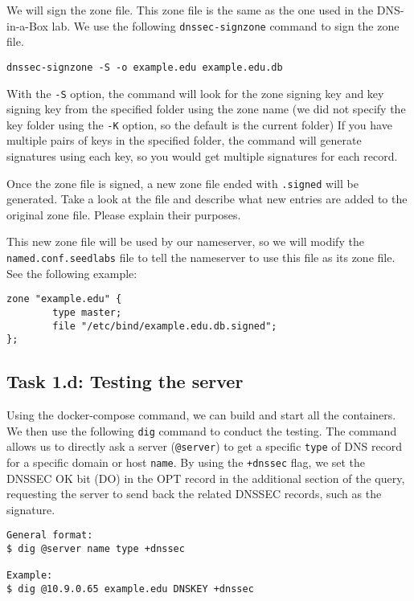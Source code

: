 We will sign the zone file. This zone file 
is the same as the one used in the DNS-in-a-Box lab. We use the 
following \texttt{dnssec-signzone} command to sign the zone file.  


\begin{lstlisting}
dnssec-signzone -S -o example.edu example.edu.db
\end{lstlisting}
 
With the \texttt{-S} option, the command will look
for the zone signing key and key signing key 
from the specified folder using the zone name (we did not specify the key folder 
using the \texttt{-K} option, so the default is the current folder)
If you have multiple pairs of keys in the specified folder,
the command will generate signatures using each key, so you would get 
multiple signatures for each record. 


Once the zone file is signed, a new zone file ended with
\texttt{.signed} will be generated. Take a look at the file and describe 
what new entries are added to the original zone file. Please explain
their purposes. 


This new zone file will be used by our nameserver, so 
we will modify the \texttt{named.conf.seedlabs} file to tell the 
nameserver to use this file as its zone file. See the following 
example: 

\begin{lstlisting}
zone "example.edu" {
        type master;
        file "/etc/bind/example.edu.db.signed";
};
\end{lstlisting}


\subsection{Task 1.d: Testing the server}

Using the docker-compose command, we can build and start all the 
containers. We then use the following \texttt{dig} command to conduct the testing. 
The command allows us to directly ask 
a server (\texttt{@server}) to get a specific \texttt{type}
of DNS record for a specific domain or host \texttt{name}.
By using the \texttt{+dnssec} flag, we set the DNSSEC OK bit (DO) in the OPT record 
in the additional section of the query, requesting the server to
send back the related DNSSEC records, such as the signature. 

\begin{lstlisting}
General format:
$ dig @server name type +dnssec

Example:
$ dig @10.9.0.65 example.edu DNSKEY +dnssec
\end{lstlisting}
 

